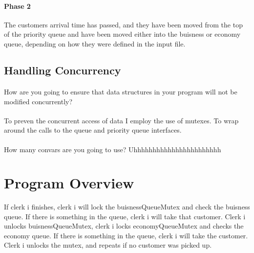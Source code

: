 \documentclass[12pt, letterpaper]{article}
\begin{document}
\paragraph{Phase 2}
The customers arrival time has passed, and they have been moved from the top of the priority queue and have been moved either into the buisness or economy queue, depending on how they were defined in the input file.

\subsection{Handling Concurrency}
\paragraph{}
How are you going to ensure that data structures in your program will not be modified concurrently?

\paragraph{}
To preven the concurrent access of data I employ the use of mutexes. To wrap around the calls to the queue and priority queue interfaces.


\paragraph{}
How many convars are you going to use? Uhhhhhhhhhhhhhhhhhhhhhhh

\section{Program Overview}

\paragraph{}
If clerk i finishes, clerk i will lock the buisnessQueueMutex and check the buisness queue. If there is something in the queue, clerk i will take that customer. Clerk i unlocks buisnessQueueMutex, clerk i locks economyQueueMutex and checks the economy queue. If there is something in the queue, clerk i will take the customer. Clerk i unlocks the mutex, and repeats if no customer was picked up.
\end{document}
